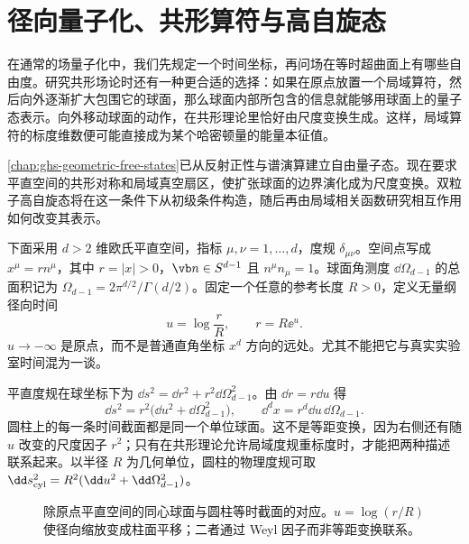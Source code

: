 \chapter{径向量子化、共形算符与高自旋态}\label{chap:ghs-radial-highspin-states}
\label{chap:ghs-radial-quantization}
\label{chap:ghs-interaction-anomalous-dimensions}



在通常的场量子化中，我们先规定一个时间坐标，再问场在等时超曲面上有哪些自由度。研究共形场论时还有一种更合适的选择：如果在原点放置一个局域算符，然后向外逐渐扩大包围它的球面，那么球面内部所包含的信息就能够用球面上的量子态表示。向外移动球面的动作，在共形理论里恰好由尺度变换生成。这样，局域算符的标度维数便可能直接成为某个哈密顿量的能量本征值。

\cref{chap:ghs-geometric-free-states}已从反射正性与谱演算建立自由量子态。现在要求平直空间的共形对称和局域真空扇区，使扩张球面的边界演化成为尺度变换。双粒子高自旋态将在这一条件下从初级条件构造，随后再由局域相关函数研究相互作用如何改变其表示。

下面采用 $d>2$ 维欧氏平直空间，指标 $\mu,\nu=1,\ldots,d$，度规 $\delta_{\mu\nu}$。空间点写成 $x^\mu=r n^\mu$，其中 $r=|x|>0$，$\vb n\in S^{d-1}$ 且 $n^\mu n_\mu=1$。球面角测度 $\dd\Omega_{d-1}$ 的总面积记为 $\Omega_{d-1}=2\pi^{d/2}/\Gamma(d/2)$。固定一个任意的参考长度 $R>0$，定义无量纲径向时间
\begin{equation}\label{eq:ghs-radial-time}
 u=\log\frac rR,\qquad r=R\ee^u.
\end{equation}
$u\to-\infty$ 是原点，而不是普通直角坐标 $x^d$ 方向的远处。尤其不能把它与真实实验室时间混为一谈。


平直度规在球坐标下为 $\dd s^2=\dd r^2+r^2\dd\Omega_{d-1}^2$。由 $\dd r=r\dd u$ 得
\begin{equation}\label{eq:ghs-weyl-cylinder}
 \dd s^2=r^2\bigl(\dd u^2+\dd\Omega_{d-1}^2\bigr),\qquad
 \dd^d x=r^d\dd u\,\dd\Omega_{d-1}.
\end{equation}
圆柱上的每一条时间截面都是同一个单位球面。这不是等距变换，因为右侧还有随 $u$ 改变的尺度因子 $r^2$；只有在共形理论允许局域度规重标度时，才能把两种描述联系起来。以半径 $R$ 为几何单位，圆柱的物理度规可取 $\dd s_{\rm cyl}^2=R^2(\dd u^2+\dd\Omega_{d-1}^2)$。

\begin{figure}[htbp]
\centering

\caption{除原点平直空间的同心球面与圆柱等时截面的对应。$u=\log(r/R)$ 使径向缩放变成柱面平移；二者通过 Weyl 因子而非等距变换联系。}\label{fig:ghs-radial-annulus-cylinder}
\end{figure}

